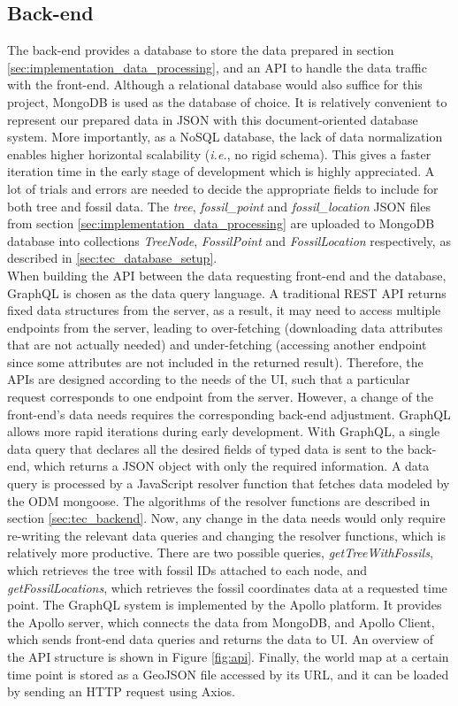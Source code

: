 \documentclass[11pt, a4paper,oneside,chapterprefix=false]{scrbook}
\begin{document}
\subsection{Back-end} \label{subsec: implementation_backend}
The back-end provides a database to store the data prepared in section \ref{sec:implementation_data_processing}, and an API to handle the data traffic with the front-end. Although a relational database would also suffice for this project, MongoDB is used as the database of choice. It is relatively convenient to represent our prepared data in JSON with this document-oriented database system. More importantly, as a NoSQL database, the lack of data normalization enables higher horizontal scalability (\emph{i.e.}, no rigid schema). This gives a faster iteration time in the early stage of development which is highly appreciated. A lot of trials and errors are needed to decide the appropriate fields to include for both tree and fossil data. The \emph{tree}, \emph{fossil\_point} and \emph{fossil\_location} JSON files from section \ref{sec:implementation_data_processing} are uploaded to MongoDB database into collections \emph{TreeNode}, \emph{FossilPoint} and \emph{FossilLocation} respectively, as described in \ref{sec:tec_database_setup}.\\

When building the API between the data requesting front-end and the database, GraphQL is chosen as the data query language. A traditional REST API returns fixed data structures from the server, as a result, it may need to access multiple endpoints from the server, leading to over-fetching (downloading data attributes that are not actually needed) and under-fetching (accessing another endpoint since some attributes are not included in the returned result). Therefore, the APIs are designed according to the needs of the UI, such that a particular request corresponds to one endpoint from the server. However, a change of the front-end's data needs requires the corresponding back-end adjustment. GraphQL allows more rapid iterations during early development. With GraphQL, a single data query that declares all the desired fields of typed data is sent to the back-end, which returns a JSON object with only the required information. A data query is processed by a JavaScript resolver function that fetches data modeled by the ODM mongoose. The algorithms of the resolver functions are described in section \ref{sec:tec_backend}. Now, any change in the data needs would only require re-writing the relevant data queries and changing the resolver functions, which is relatively more productive. There are two possible queries, \emph{getTreeWithFossils}, which retrieves the tree with fossil IDs attached to each node, and \emph{getFossilLocations}, which retrieves the fossil coordinates data at a requested time point. The GraphQL system is implemented by the Apollo platform. It provides the Apollo server, which connects the data from MongoDB, and Apollo Client, which sends front-end data queries and returns the data to UI. An overview of the API structure is shown in Figure \ref{fig:api}. Finally, the world map at a certain time point is stored as a GeoJSON file accessed by its URL, and it can be loaded by sending an HTTP request using Axios. \\
\end{document}

